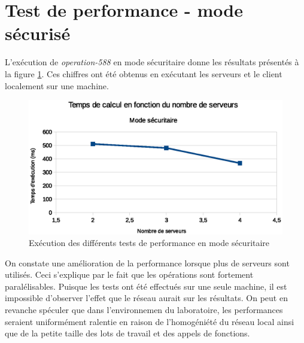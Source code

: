 \section{Test de performance - mode sécurisé}
L'exécution de \emph{operation-588} en mode sécuritaire donne les résultats présentés à la figure \ref{fig:safe}. Ces chiffres ont été obtenus en exécutant les serveurs et le client localement sur une machine. 

\begin{figure}
  \includegraphics[width=\linewidth]{safe_exec.eps}
  \caption{ Exécution des différents tests de performance en mode sécuritaire }
  \label{fig:safe}
\end{figure}

On constate une amélioration de la performance lorsque plus de serveurs sont utilisés. Ceci s'explique par le fait que les
opérations sont fortement paralélisables. Puisque les tests ont été effectués sur une seule machine, il est impossible d'observer l'effet que le réseau aurait sur les résultats. On peut en revanche spéculer que dans l'environnemen du laboratoire, les performances seraient uniformément ralentie en raison de l'homogéniété du réseau local ainsi que de la petite taille des lots de travail et des appels de fonctions. 


